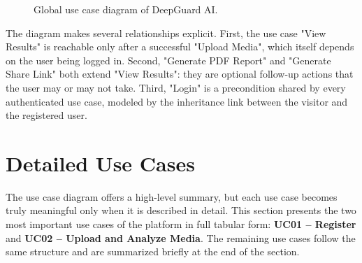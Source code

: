 \begin{figure}[H]
\centering
{}
\caption{Global use case diagram of DeepGuard AI.}
\label{fig:usecase}
\end{figure}

The diagram makes several relationships explicit. First, the use case "View Results" is reachable only after a successful "Upload Media", which itself depends on the user being logged in. Second, "Generate PDF Report" and "Generate Share Link" both extend "View Results": they are optional follow-up actions that the user may or may not take. Third, "Login" is a precondition shared by every authenticated use case, modeled by the inheritance link between the visitor and the registered user.

\section{Detailed Use Cases}

The use case diagram offers a high-level summary, but each use case becomes truly meaningful only when it is described in detail. This section presents the two most important use cases of the platform in full tabular form: \textbf{UC01 -- Register} and \textbf{UC02 -- Upload and Analyze Media}. The remaining use cases follow the same structure and are summarized briefly at the end of the section.

